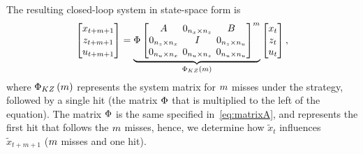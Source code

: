 The resulting closed-loop system in state-space form is
%
\begin{equation} 
    \setlength\arraycolsep{2pt}
    \label{eq:KZ}
    \begin{bmatrix}
        x_{t+\nummisses+1} \\
        z_{t+\nummisses+1} \\
        u_{t+\nummisses+1}
    \end{bmatrix} = 
    \underbrace{ \clmat{} \begin{bmatrix}
        \Ap                                         & 0_{n_x \times n_z}  & \Bp \\
        0_{n_z \times n_x}    & I                                         & 0_{n_z \times n_u} \\
        0_{n_u \times n_x}   & 0_{n_u \times n_z}   & 0_{n_u \times n_u}
    \end{bmatrix}^{\nummisses}}_{\clmat{}_{KZ}\funof{\nummisses}}
    \begin{bmatrix}
        x_{t} \\
        z_{t} \\
        u_{t}
    \end{bmatrix},
\end{equation}
%
where $\Phi{}_{KZ}\left( m \right)$ represents the system matrix for $m$ misses under the \tKZ{} strategy, followed by a single hit (the matrix $\Phi{}$ that is multiplied to the left of the equation).
The matrix $\Phi{}$ is the same specified in~\eqref{eq:matrixA}, and represents the first hit that follows the $m$ misses, hence, we determine how $\tilde{x}_t$ influences $\tilde{x}_{t+m+1}$ ($m$ misses and one hit).

